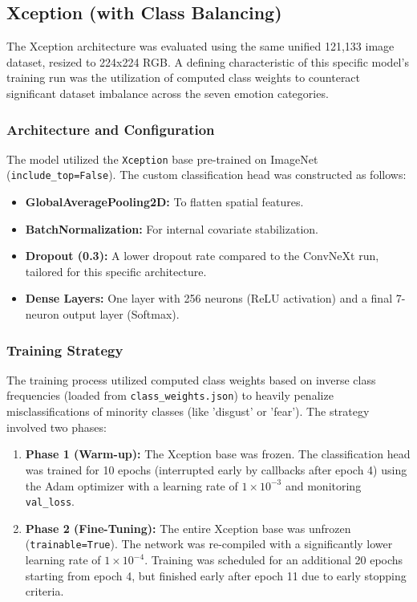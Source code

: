 \documentclass{article}
\begin{document}
\subsection{Xception (with Class Balancing)}
The Xception architecture was evaluated using the same unified 121,133 image dataset, resized to 224x224 RGB. A defining characteristic of this specific model's training run was the utilization of computed class weights to counteract significant dataset imbalance across the seven emotion categories.

\subsubsection{Architecture and Configuration}
The model utilized the \texttt{Xception} base pre-trained on ImageNet (\texttt{include\_top=False}). The custom classification head was constructed as follows:
\begin{itemize}
    \item \textbf{GlobalAveragePooling2D:} To flatten spatial features.
    \item \textbf{BatchNormalization:} For internal covariate stabilization.
    \item \textbf{Dropout (0.3):} A lower dropout rate compared to the ConvNeXt run, tailored for this specific architecture.
    \item \textbf{Dense Layers:} One layer with 256 neurons (ReLU activation) and a final 7-neuron output layer (Softmax).
\end{itemize}

\subsubsection{Training Strategy}
The training process utilized computed class weights based on inverse class frequencies (loaded from \texttt{class\_weights.json}) to heavily penalize misclassifications of minority classes (like 'disgust' or 'fear'). The strategy involved two phases:

\begin{enumerate}
    \item \textbf{Phase 1 (Warm-up):} The Xception base was frozen. The classification head was trained for 10 epochs (interrupted early by callbacks after epoch 4) using the Adam optimizer with a learning rate of $1 \times 10^{-3}$ and monitoring \texttt{val\_loss}.
    \item \textbf{Phase 2 (Fine-Tuning):} The entire Xception base was unfrozen (\texttt{trainable=True}). The network was re-compiled with a significantly lower learning rate of $1 \times 10^{-4}$. Training was scheduled for an additional 20 epochs starting from epoch 4, but finished early after epoch 11 due to early stopping criteria.
\end{enumerate}
\end{document}
